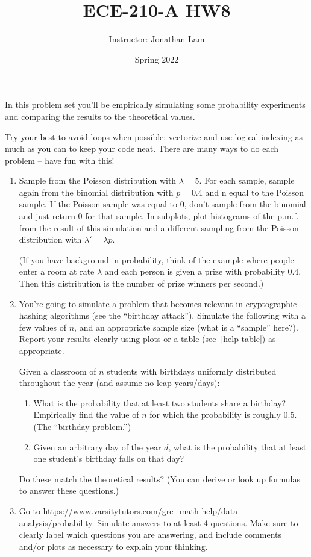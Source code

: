 \documentclass{article}
\title{ECE-210-A HW8}
\author{Instructor: Jonathan Lam}
\date{Spring 2022}
\begin{document}
\maketitle

\noindent In this problem set you'll be empirically simulating some probability experiments and comparing the results to the theoretical values.

Try your best to avoid loops when possible; vectorize and use logical indexing as much as you can to keep your code neat. There are many ways to do each problem -- have fun with this!

\begin{enumerate}
\item Sample from the Poisson distribution with $\lambda=5$. For each sample, sample
  again from the binomial distribution with $p=0.4$ and n equal to the Poisson
  sample. If the Poisson sample was equal to 0, don’t sample from the binomial
  and just return 0 for that sample. In subplots, plot histograms of the p.m.f.
  from the result of this simulation and a different sampling from the Poisson
  distribution with $\lambda'=\lambda p$.
  
  (If you have background in probability, think of the
  example where people enter a room at rate $\lambda$ and each person is given a prize
  with probability 0.4. Then this distribution is the number of prize
  winners per second.)
  
\item You're going to simulate a problem that becomes relevant in cryptographic hashing algorithms (see the ``birthday attack''). Simulate the following with a few values of $n$, and an appropriate sample size (what is a ``sample'' here?). Report your results clearly using plots or a table (see \texttt|help table|) as appropriate.
  
  Given a classroom of $n$ students with birthdays uniformly distributed throughout the year (and assume no leap years/days):
  
  \begin{enumerate}
  \item What is the probability that at least two students share a birthday? Empirically find the value of $n$ for which the probability is roughly 0.5. (The ``birthday problem.'')
    
  \item Given an arbitrary day of the year $d$, what is the probability that at least one student's birthday falls on that day?
  \end{enumerate}
  
  Do these match the theoretical results? (You can derive or look up formulas to answer these questions.)
  
  \clearpage
\item Go to \url{https://www.varsitytutors.com/gre_math-help/data-analysis/probability}. Simulate answers to at least 4 questions. Make sure to clearly label which questions you are answering, and include comments and/or plots as necessary to explain your thinking.
\end{enumerate}
\end{document}
